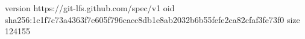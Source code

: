 version https://git-lfs.github.com/spec/v1
oid sha256:1c1f7c73a4363f7e605f796cacc8db1e8ab2032b6b55fefe2ca82cfaf3fe73f0
size 124155
